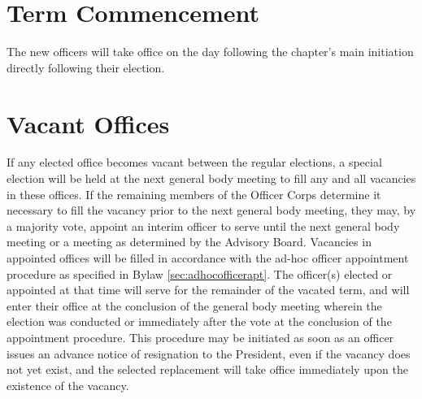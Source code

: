  
\section{Term Commencement}
The new officers will take office on the day following the chapter's main initiation directly following their election.
\section{Vacant Offices}
If any elected office becomes vacant between the regular elections, a special election will be held at the next general body meeting to fill any and all vacancies in these offices.
If the remaining members of the Officer Corps determine it necessary to fill the vacancy prior to the next general body meeting, they may, by a majority vote, appoint an interim officer to serve until the next general body meeting or a meeting as determined by the Advisory Board.
Vacancies in appointed offices will be filled in accordance with the ad-hoc officer appointment procedure as specified in Bylaw \ref{sec:adhocofficerapt}.
The officer(s) elected or appointed at that time will serve for the remainder of the vacated term, and will enter their office at the conclusion of the general body meeting wherein the election was conducted or immediately after the vote at the conclusion of the appointment procedure.
This procedure may be initiated as soon as an officer issues an advance notice of resignation to the President, even if the vacancy does not yet exist, and the selected replacement will take office immediately upon the existence of the vacancy.

